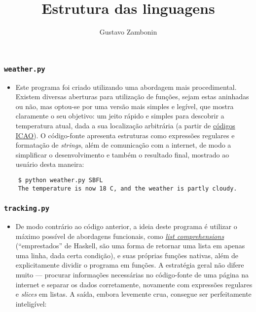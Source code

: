 \documentclass{../sftex/sftex}
\title{Estrutura das linguagens}
\author{Gustavo Zambonin}
\begin{document}
\maketitle

\subsubsection*{\texttt{weather.py}}
\begin{itemize}
    \item Este programa foi criado utilizando uma abordagem mais procedimental.
    Existem diversas aberturas para utilização de funções, sejam estas aninhadas
    ou não, mas optou-se por uma versão mais simples e legível, que mostra
    claramente o seu objetivo: um jeito rápido e simples para descobrir a
    temperatura atual, dada a sua localização arbitrária (a partir de
    \href{http://www.flugzeuginfo.net/table_airportcodes_country-location_en.php}
    {códigos ICAO}). O código-fonte apresenta estruturas como expressões
    regulares e formatação de \emph{strings}, além de comunicação com a
    internet, de modo a simplificar o desenvolvimento e também o resultado
    final, mostrado ao usuário desta maneira:
\end{itemize}

\begin{verbatim}
    $ python weather.py SBFL
    The temperature is now 18 C, and the weather is partly cloudy.
\end{verbatim}

\subsubsection*{\texttt{tracking.py}}
\begin{itemize}
    \item De modo contrário ao código anterior, a ideia deste programa é
    utilizar o máximo possível de abordagens funcionais, como
    \href{https://docs.python.org/3/howto/functional.html#generator-expressions-and-list-comprehensions}
    {\emph{list comprehensions}} (``emprestados'' de Haskell, são uma forma de
    retornar uma lista em apenas uma linha, dada certa condição), e suas
    próprias funções nativas, além de explicitamente dividir o programa em
    funções. A estratégia geral não difere muito --- procurar informações
    necessárias no código-fonte de uma página na internet e separar os dados
    corretamente, novamente com expressões regulares e \emph{slices} em
    listas. A saída, embora levemente crua, consegue ser perfeitamente
    inteligível:
\end{itemize}
\end{document}
